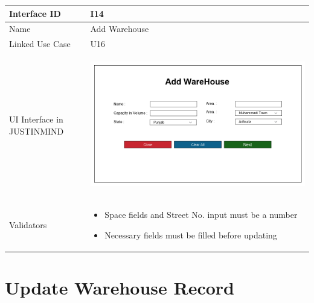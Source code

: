 \documentclass[12pt,a4paper]{report}
\begin{document}
\begin{tabular}{ | m{3cm} | m{12cm}| } \hline

Interface ID &  I14 \\\hline

Name  & Add Warehouse  \\ \hline

Linked Use Case & U16	 \\ \hline


UI Interface in JUSTINMIND & \begin{center} \includegraphics[scale=0.3]{./User Interface/UI-013 AddWarehouse@1x.png}\end{center}  \\ \hline


Validators & 
\begin{itemize}
\item   Space fields and Street No. input must be a number
\item  Necessary fields must be filled before updating


\end{itemize}
\\ \hline

\end{tabular} 
\section{Update Warehouse Record}
\end{document}
